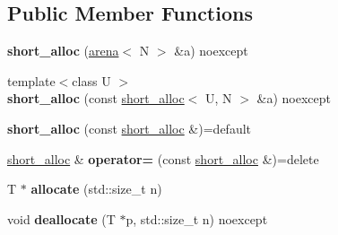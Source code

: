 \subsection*{Public Member Functions}
\begin{DoxyCompactItemize}
\item 
\hypertarget{classshort__alloc_a8a0e76a30504c02b43d8c1bd69edee4a}{{\bfseries short\+\_\+alloc} (\hyperlink{classarena}{arena}$<$ N $>$ \&a) noexcept}\label{classshort__alloc_a8a0e76a30504c02b43d8c1bd69edee4a}

\item 
\hypertarget{classshort__alloc_ab50054f6be6a9f5903e5b093eae51ebe}{{\footnotesize template$<$class U $>$ }\\{\bfseries short\+\_\+alloc} (const \hyperlink{classshort__alloc}{short\+\_\+alloc}$<$ U, N $>$ \&a) noexcept}\label{classshort__alloc_ab50054f6be6a9f5903e5b093eae51ebe}

\item 
\hypertarget{classshort__alloc_a4ac9bacee5240f184dec87bd1204aa73}{{\bfseries short\+\_\+alloc} (const \hyperlink{classshort__alloc}{short\+\_\+alloc} \&)=default}\label{classshort__alloc_a4ac9bacee5240f184dec87bd1204aa73}

\item 
\hypertarget{classshort__alloc_ab3289fc8d6c4ee315fc77f165e0b5981}{\hyperlink{classshort__alloc}{short\+\_\+alloc} \& {\bfseries operator=} (const \hyperlink{classshort__alloc}{short\+\_\+alloc} \&)=delete}\label{classshort__alloc_ab3289fc8d6c4ee315fc77f165e0b5981}

\item 
\hypertarget{classshort__alloc_a810d781819bd99b26a72ac05badee435}{T $\ast$ {\bfseries allocate} (std\+::size\+\_\+t n)}\label{classshort__alloc_a810d781819bd99b26a72ac05badee435}

\item 
\hypertarget{classshort__alloc_af12ddf5e2f8414804f3a8bb934dbbccc}{void {\bfseries deallocate} (T $\ast$p, std\+::size\+\_\+t n) noexcept}\label{classshort__alloc_af12ddf5e2f8414804f3a8bb934dbbccc}

\end{DoxyCompactItemize}
